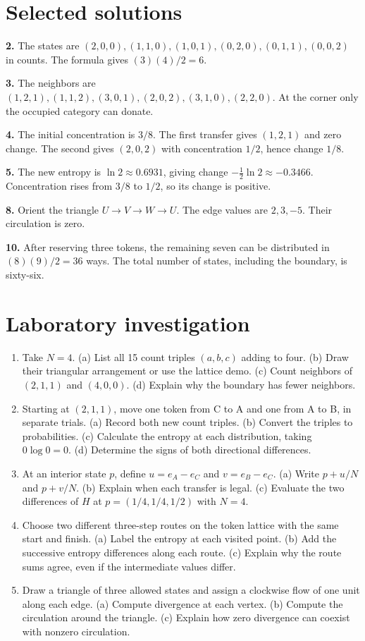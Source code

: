\documentclass[11pt,oneside,openany]{book}
\theoremstyle{definition}
\theoremstyle{remark}
\numberwithin{equation}{chapter}
\providecommand{\tightlist}{\setlength{\itemsep}{0pt}\setlength{\parskip}{0pt}}
\newcommand{\labheading}{\FloatBarrier\section*{Laboratory investigation}\addcontentsline{toc}{section}{Laboratory investigation}}
\begin{document}
\section{Selected solutions}\label{ch03-selected-solutions}

\textbf{2.} The states are \((2,0,0),(1,1,0),(1,0,1),(0,2,0),(0,1,1),(0,0,2)\) in counts. The formula gives \((3)(4)/2=6\).

\textbf{3.} The neighbors are \((1,2,1),(1,1,2),(3,0,1),(2,0,2),(3,1,0),(2,2,0)\). At the corner only the occupied category can donate.

\textbf{4.} The initial concentration is \(3/8\). The first transfer gives \((1,2,1)\) and zero change. The second gives \((2,0,2)\) with concentration \(1/2\), hence change \(1/8\).

\textbf{5.} The new entropy is \(\ln2\approx0.6931\), giving change \(-\tfrac12\ln2\approx-0.3466\). Concentration rises from \(3/8\) to \(1/2\), so its change is positive.

\textbf{8.} Orient the triangle \(U\to V\to W\to U\). The edge values are \(2,3,-5\). Their circulation is zero.

\textbf{10.} After reserving three tokens, the remaining seven can be distributed in \((8)(9)/2=36\) ways. The total number of states, including the boundary, is sixty-six.
\labheading\begin{enumerate}
\def\labelenumi{\arabic{enumi}.}
\tightlist
\item
  Take \(N=4\). (a) List all 15 count triples \((a,b,c)\) adding to four. (b) Draw their triangular arrangement or use the lattice demo. (c) Count neighbors of \((2,1,1)\) and \((4,0,0)\). (d) Explain why the boundary has fewer neighbors.
\item
  Starting at \((2,1,1)\), move one token from C to A and one from A to B, in separate trials. (a) Record both new count triples. (b) Convert the triples to probabilities. (c) Calculate the entropy at each distribution, taking \(0\log0=0\). (d) Determine the signs of both directional differences.
\item
  At an interior state \(p\), define \(u=e_A-e_C\) and \(v=e_B-e_C\). (a) Write \(p+u/N\) and \(p+v/N\). (b) Explain when each transfer is legal. (c) Evaluate the two differences of \(H\) at \(p=(1/4,1/4,1/2)\) with \(N=4\).
\item
  Choose two different three-step routes on the token lattice with the same start and finish. (a) Label the entropy at each visited point. (b) Add the successive entropy differences along each route. (c) Explain why the route sums agree, even if the intermediate values differ.
\item
  Draw a triangle of three allowed states and assign a clockwise flow of one unit along each edge. (a) Compute divergence at each vertex. (b) Compute the circulation around the triangle. (c) Explain how zero divergence can coexist with nonzero circulation.
\end{enumerate}
\end{document}
